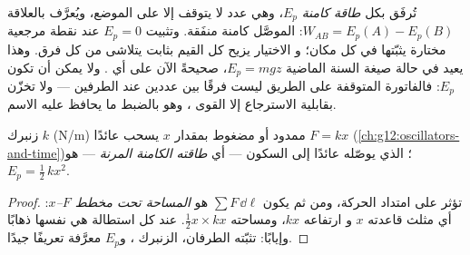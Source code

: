 \begin{definition}\label{def:g12:work-and-energy:ep}
تُرفَق بكل 
\emph{طاقة كامنة}
$E_p$، وهي عدد لا يتوقف إلا على الموضع، ويُعرَّف بالعلاقة
$W_{AB} = E_p(A) - E_p(B)$:  الموصَّل  كامنة منفَقة.
وتثبيت $E_p = 0$ عند نقطة مرجعية مختارة يثبّتها في كل مكان؛ و
الاختيار يزيح كل القيم بثابت يتلاشى من كل
فرق. وهذا يعيد في حالة  صيغة السنة الماضية $E_p = mgz$،
صحيحةً الآن على أي . ولا يمكن أن تكون  $E_p$: فالفاتورة
المتوقفة على الطريق ليست فرقًا بين عددين عند الطرفين --- ولا تخزّن
بقابلية الاسترجاع إلا القوى ، وهو بالضبط ما يحافظ عليه الاسم.
\end{definition}

\begin{proposition}\label{prop:g12:work-and-energy:elastic}
زنبرك  $k$ (\unit{N/m}) ممدود أو مضغوط بمقدار $x$
يسحب عائدًا  $F = kx$
(\cref{ch:g12:oscillators-and-time})؛  الذي يوصّله عائدًا
إلى السكون --- أي
\emph{طاقته الكامنة المرنة} --- هو
$E_p = \tfrac12\, k x^2$.
\end{proposition}

\begin{proof}
تؤثر  على امتداد الحركة، ومن ثم يكون $\sum F\,\dd\ell$
هو \emph{المساحة تحت مخطط $F$--$x$}: أي مثلث قاعدته $x$ و
ارتفاعه $kx$، ومساحته $\tfrac12 x \times kx$.  عند كل استطالة
هي نفسها ذهابًا وإيابًا:  تثبّته الطرفان،  الزنبرك
، و$E_p$ معرَّفة تعريفًا جيدًا.
\end{proof}

